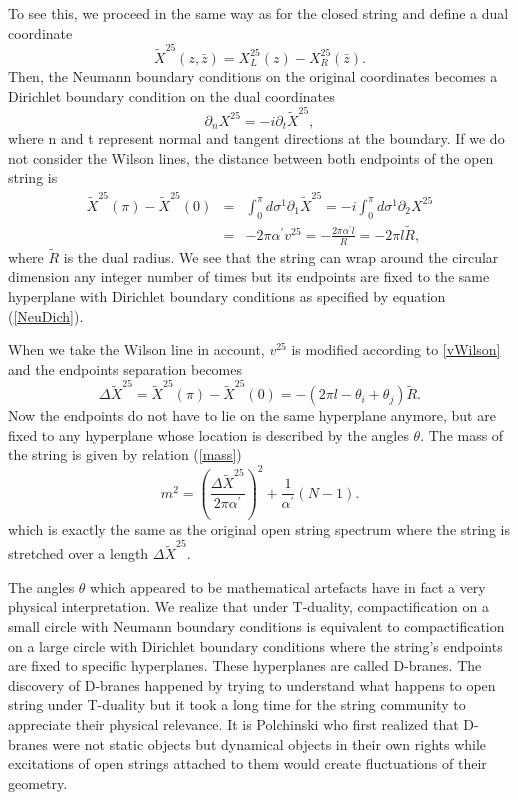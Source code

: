 \documentclass[12pt,letterpaper]{article}
\def\be{\begin{equation}}
\def\ee{\end{equation}}
\def\bear{\begin{eqnarray}}
\def\eear{\end{eqnarray}}
\def\nn{\nonumber}
\begin{document}
To see this, we proceed in the same way as for the closed string and define a dual coordinate
\be
\tilde{X}^{25}(z,\bar{z})=X^{25}_{L}(z)-X^{25}_{R}(\bar{z}).
\ee
Then, the Neumann boundary conditions on the original coordinates becomes a Dirichlet boundary condition on the dual coordinates
\be\label{NeuDich}
\partial_{n}X^{25}=-i\partial_{t}\tilde{X}^{25},
\ee
where n and t represent normal and tangent directions at the boundary.  If we do not consider the Wilson lines, the distance between both endpoints of the open string is
\bear
\tilde{X}^{25}(\pi)-\tilde{X}^{25}(0)&=&\int_{0}^{\pi} d\sigma^{1}\partial_{1}\tilde{X}^{25}=-i\int_{0}^{\pi} d\sigma^{1}\partial_{2}X^{25}\nn\\
&=&-2\pi\alpha^{\prime}v^{25}=-\frac{2\pi\alpha^{\prime}l}{R}=-2\pi l\tilde{R},
\eear
where $\tilde{R}$ is the dual radius.  We see that the string can wrap around the circular dimension any integer number of times but its endpoints are fixed to the same hyperplane with Dirichlet boundary conditions as specified by equation (\ref{NeuDich}).

When we take the Wilson line in account, $v^{25}$ is modified according to \ref{vWilson} and the endpoints separation becomes
\be
\Delta\tilde{X}^{25}=\tilde{X}^{25}(\pi)-\tilde{X}^{25}(0)=-\left(2\pi l-\theta_{i}+\theta_{j}\right)\tilde{R}.
\ee
Now the endpoints do not have to lie on the same hyperplane anymore, but are fixed to any hyperplane whose location is described by the angles $\theta$.  The mass of the string is given by relation (\ref{mass})
\be
m^{2}=\left(\frac{\Delta\tilde{X}^{25}}{2\pi\alpha^{\prime}}\right)^{2}+\frac{1}{\alpha^{\prime}}\left(N-1\right).
\ee
which is exactly the same as the original open string spectrum where the string is stretched over a length $\Delta\tilde{X}^{25}$.  

The angles $\theta$ which appeared to be mathematical artefacts have in fact a very physical interpretation.  We realize that under T-duality, compactification on a small circle with Neumann boundary conditions is equivalent to compactification on a large circle with Dirichlet boundary conditions where the string's endpoints are fixed to specific hyperplanes.  These hyperplanes are called D-branes.  The discovery of D-branes happened by trying to understand what happens to open string under T-duality but it took a long time for the string community to appreciate their physical relevance.  It is Polchinski who first realized that D-branes were not static objects but dynamical objects in their own rights while excitations of open strings attached to them would create fluctuations of their geometry.  
\end{document}
